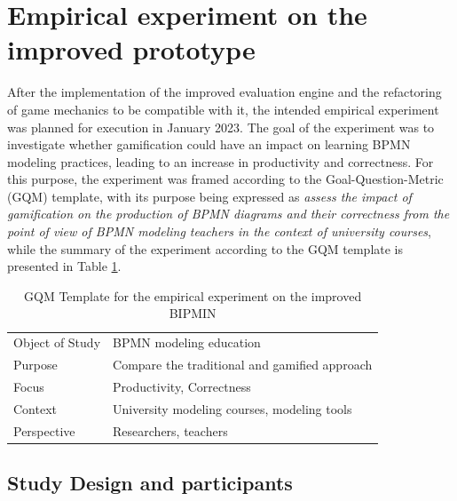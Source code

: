 \section{Empirical experiment on the improved prototype}

After the implementation of the improved evaluation engine and the refactoring of game mechanics to be compatible with it, the intended empirical experiment was planned for execution in January 2023. The goal of the experiment was to investigate whether gamification could have an impact on learning BPMN modeling practices, leading to an increase in productivity and correctness. For this purpose, the experiment was framed according to the Goal-Question-Metric (GQM) template, with its purpose being expressed as \emph{assess the impact of gamification on the production of BPMN diagrams and their correctness from the point of view of BPMN modeling teachers in the context of university courses}, while the summary of the experiment according to the GQM template is presented in Table \ref{tab:gqm3}.

\begin{table}[ht]
\small
\centering
\caption{GQM Template for the empirical experiment on the improved BIPMIN}
\begin{tabular}{@{}p{} p{}@{}}
\toprule
Object of Study & BPMN modeling education\\ 
Purpose & Compare the traditional and gamified approach \\
Focus & Productivity, Correctness \\
Context & University modeling courses, modeling tools \\
Perspective & Researchers, teachers \\ \bottomrule
\end{tabular}
\label{tab:gqm3}
\end{table}

\subsection{Study Design and participants}

